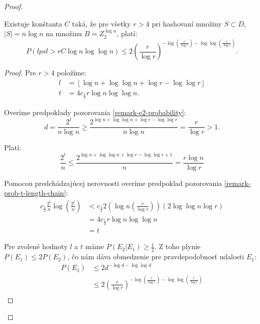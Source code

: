 \begin{proof}
\begin{remark}
Existuje konštanta $C$ taká, že pre všetky $r > 4$ pri hashovaní množiny $S \subset D$, $|S| = n \log n$ na množinu $B = Z_2^{\log n}$, platí:
\begin{displaymath}
P(lpsl > rC \log n \log \log n) \leq 2 \left(\frac{r}{\log r}\right)^{-\log \left(\frac{r}{\log r}\right) - \log \log \left(\frac{r}{\log r}\right)}\textit{.}
\end{displaymath}
\end{remark}
\begin{proof}
Pre $r > 4$ položíme:
\begin{displaymath}
\begin{split}
l & = \left\lfloor \log n + \log \log n + \log r - \log \log r \right\rfloor \\
t & = 4c_{\frac{1}{2}}r\log n \log \log n \textit{.}
\end{split}
\end{displaymath}

Overíme predpoklady pozorovania \ref{remark-e2-probability}:
\begin{displaymath}
d = \frac{2^l}{n \log n} \geq \frac{2^{\log n + \log \log n + \log r - \log \log r}}{n \log n} = \frac{r}{\log r} > 1\textit{.}
\end{displaymath}

Platí:
\begin{displaymath}
\frac{2^l}{n} \leq \frac{2 ^{\log n + \log \log n + \log r - \log \log r + 1}}{n} = \frac{r\log n}{\log r}
\end{displaymath}

Pomocou predchádzajúcej nerovnosti overíme predpoklad pozorovania \ref{remark-prob-t-length-chain}:
\begin{displaymath}
\begin{split}
c_{\frac{1}{2}}\frac{2^l}{n}\log\left(\frac{2^l}{n}\right)
	& < c_{\frac{1}{2}} 2 \left(\log n \left(\frac{r}{\log r}\right)\right)\left(2\log\log n \log r\right) \\
	& = 4 c_{\frac{1}{2}} r \log n \log \log n \\
	& = t
\end{split}
\end{displaymath}

Pre zvolené hodnoty $l$ a $t$ máme $P(E_2 | E_1) \geq \frac{1}{2}$. Z toho plynie $P(E_1) \leq 2 P(E_2)$, čo nám dáva obmedzenie pre pravdepodobnosť udalosti $E_1$:
\begin{displaymath}
\begin{split}
P(E_1) 
	& \leq 2d^{-\log d - \log \log d} \\
	& \leq 2\left(\frac{r}{\log r}\right)^{-\log \left(\frac{r}{\log r}\right) - \log \log \left(\frac{r}{\log r}\right)} \\
\end{split}
\end{displaymath}


\end{proof}
\end{proof}
